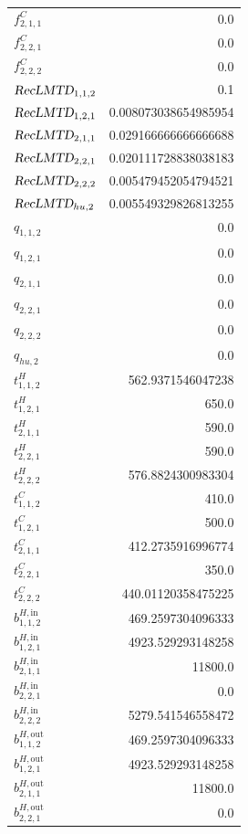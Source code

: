 \documentclass{article}%
\begin{document}
\begin{multicols*}{3}
\begin{supertabular}{lr}
	$f_{2,1,1}^{C}$ & 0.0 \\%
	$f_{2,2,1}^{C}$ & 0.0 \\%
	$f_{2,2,2}^{C}$ & 0.0 \\%
	$\textsl{RecLMTD}_{1,1,2}$ & 0.1 \\%
	$\textsl{RecLMTD}_{1,2,1}$ & 0.008073038654985954 \\%
	$\textsl{RecLMTD}_{2,1,1}$ & 0.029166666666666688 \\%
	$\textsl{RecLMTD}_{2,2,1}$ & 0.020111728838038183 \\%
	$\textsl{RecLMTD}_{2,2,2}$ & 0.005479452054794521 \\%
	$\textsl{RecLMTD}_{hu,2}$ & 0.005549329826813255 \\%
	$q_{1,1,2}$ & 0.0 \\%
	$q_{1,2,1}$ & 0.0 \\%
	$q_{2,1,1}$ & 0.0 \\%
	$q_{2,2,1}$ & 0.0 \\%
	$q_{2,2,2}$ & 0.0 \\%
	$q_{hu,2}$ & 0.0 \\%
	$t_{1,1,2}^{H}$ & 562.9371546047238 \\%
	$t_{1,2,1}^{H}$ & 650.0 \\%
	$t_{2,1,1}^{H}$ & 590.0 \\%
	$t_{2,2,1}^{H}$ & 590.0 \\%
	$t_{2,2,2}^{H}$ & 576.8824300983304 \\%
	$t_{1,1,2}^{C}$ & 410.0 \\%
	$t_{1,2,1}^{C}$ & 500.0 \\%
	$t_{2,1,1}^{C}$ & 412.2735916996774 \\%
	$t_{2,2,1}^{C}$ & 350.0 \\%
	$t_{2,2,2}^{C}$ & 440.01120358475225 \\%
	$b_{1,1,2}^{H,\text{in}}$ & 469.2597304096333 \\%
	$b_{1,2,1}^{H,\text{in}}$ & 4923.529293148258 \\%
	$b_{2,1,1}^{H,\text{in}}$ & 11800.0 \\%
	$b_{2,2,1}^{H,\text{in}}$ & 0.0 \\%
	$b_{2,2,2}^{H,\text{in}}$ & 5279.541546558472 \\%
	$b_{1,1,2}^{H,\text{out}}$ & 469.2597304096333 \\%
	$b_{1,2,1}^{H,\text{out}}$ & 4923.529293148258 \\%
	$b_{2,1,1}^{H,\text{out}}$ & 11800.0 \\%
	$b_{2,2,1}^{H,\text{out}}$ & 0.0 \\%

\end{supertabular}
\end{multicols*}
\end{document}
